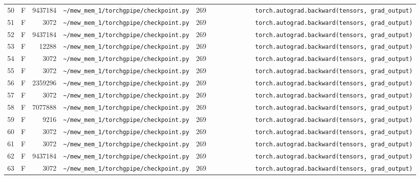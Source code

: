\documentclass{article}
\begin{document}
\begin{longtable}{r l r p{6.5cm} r p{7.0cm}}
50 & F & 9437184 & \lstinline|~/mew_mem_1/torchgpipe/checkpoint.py| & 269 & \lstinline|            torch.autograd.backward(tensors, grad_output)| \\
51 & F & 3072 & \lstinline|~/mew_mem_1/torchgpipe/checkpoint.py| & 269 & \lstinline|            torch.autograd.backward(tensors, grad_output)| \\
52 & F & 9437184 & \lstinline|~/mew_mem_1/torchgpipe/checkpoint.py| & 269 & \lstinline|            torch.autograd.backward(tensors, grad_output)| \\
53 & F & 12288 & \lstinline|~/mew_mem_1/torchgpipe/checkpoint.py| & 269 & \lstinline|            torch.autograd.backward(tensors, grad_output)| \\
54 & F & 3072 & \lstinline|~/mew_mem_1/torchgpipe/checkpoint.py| & 269 & \lstinline|            torch.autograd.backward(tensors, grad_output)| \\
55 & F & 3072 & \lstinline|~/mew_mem_1/torchgpipe/checkpoint.py| & 269 & \lstinline|            torch.autograd.backward(tensors, grad_output)| \\
56 & F & 2359296 & \lstinline|~/mew_mem_1/torchgpipe/checkpoint.py| & 269 & \lstinline|            torch.autograd.backward(tensors, grad_output)| \\
57 & F & 3072 & \lstinline|~/mew_mem_1/torchgpipe/checkpoint.py| & 269 & \lstinline|            torch.autograd.backward(tensors, grad_output)| \\
58 & F & 7077888 & \lstinline|~/mew_mem_1/torchgpipe/checkpoint.py| & 269 & \lstinline|            torch.autograd.backward(tensors, grad_output)| \\
59 & F & 9216 & \lstinline|~/mew_mem_1/torchgpipe/checkpoint.py| & 269 & \lstinline|            torch.autograd.backward(tensors, grad_output)| \\
60 & F & 3072 & \lstinline|~/mew_mem_1/torchgpipe/checkpoint.py| & 269 & \lstinline|            torch.autograd.backward(tensors, grad_output)| \\
61 & F & 3072 & \lstinline|~/mew_mem_1/torchgpipe/checkpoint.py| & 269 & \lstinline|            torch.autograd.backward(tensors, grad_output)| \\
62 & F & 9437184 & \lstinline|~/mew_mem_1/torchgpipe/checkpoint.py| & 269 & \lstinline|            torch.autograd.backward(tensors, grad_output)| \\
63 & F & 3072 & \lstinline|~/mew_mem_1/torchgpipe/checkpoint.py| & 269 & \lstinline|            torch.autograd.backward(tensors, grad_output)| \\

\end{longtable}
\end{document}
